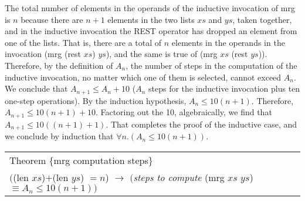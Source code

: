 The total number of elements in the operands of the inductive invocation of mrg
is $n$ because there are $n+1$ elements in the two lists $xs$ and $ys$,
taken together, and in the inductive invocation the REST operator has
dropped an element from one of the lists.
That is, there are a total of $n$ elements in the operands
in the invocation (mrg (rest $xs$) $ys$),
and the same is true of (mrg $xs$ (rest $ys$)).
Therefore, by the definition of $A_n$,
the number of steps in the computation of the inductive invocation,
no matter which one of them is selected, cannot exceed $A_n$.
We conclude that $A_{n+1} \leq A_n + 10$
($A_n$ steps for the inductive invocation
plus ten one-step operations).
By the induction hypothesis, $A_n \leq 10(n+1)$.
Therefore, $A_{n+1} \leq 10(n+1) + 10$.
Factoring out the 10, algebraically,
we find that $A_{n+1} \leq 10((n+1) + 1)$.
That completes the proof of the inductive case,
and we conclude by induction that $\forall n.(A_n \leq 10(n+1))$.
\label{thm:mrg-computation-time}\label{thm:mrg-steps}
\begin{center}
\begin{tabular}{l}
Theorem \{mrg computation steps\}\\
$($(len $xs$)$+$(len $ys$) $= n$) $\rightarrow$ $($\emph{steps to compute} (mrg $xs$ $ys$) $\equiv A_n \leq 10(n+1))$\\
\end{tabular}
\end{center}

